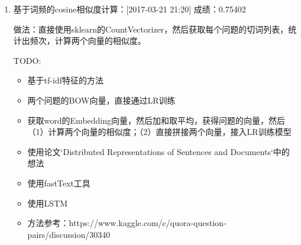 \documentclass[10pt,a4paper]{ctexbook}
\begin{document}
\begin{enumerate}
\item 基于词频的cosine相似度计算：[2017-03-21 21:20]
成绩：0.75402

做法：直接使用sklearn的CountVectorizer，然后获取每个问题的切词列表，统计出频次，计算两个向量的相似度。

TODO: 
\begin{itemize}
\item 基于tf-idf特征的方法
\item 两个问题的BOW向量，直接通过LR训练
\item 获取word的Embedding向量，然后加和取平均，获得问题的向量，然后（1）计算两个向量的相似度；（2）直接拼接两个向量，接入LR训练模型
\item 使用论文`Distributed Representations of Sentences and Documents`中的想法
\item 使用fastText工具
\item 使用LSTM
\item 方法参考：https://www.kaggle.com/c/quora-question-pairs/discussion/30340
\end{itemize}

\end{enumerate}

\ifx\mlbook\undefined
    
\end{document}
